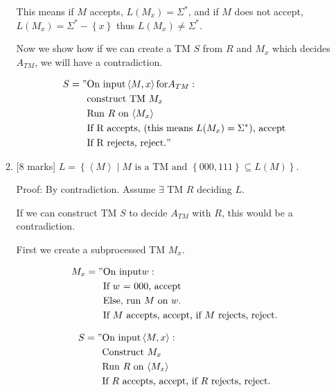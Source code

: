 \documentclass{article}
\newcommand{\set}[1]{{\left\{#1\right\}}}    %
\newcommand{\enc}[1]{\left<#1\right>}
\begin{document}
\begin{enumerate}
\begin{enumerate}
                    This means if $M$ accepts, $L(M_x) = \Sigma^*$, and if $M$ does not accept, $L(M_x) = \Sigma^* - \set{x}$ thus $L(M_x) \neq \Sigma^*$.

                    Now we show how if we can create a TM $S$ from $R$ and $M_x$ which decides $A_{TM}$, we will have a contradiction.

                    \begin{equation}
                        \begin{split}
                           S = "& \text{On input} \enc{M,x} \text{for} A_{TM}: \\
                                & \text{construct TM } M_x \\
                                & \text{Run $R$ on $\enc{M_x}$} \\
                                & \text{If R accepts, (this means $L(M_x) = \Sigma^*$), accept} \\
                                & \text{If R rejects, reject.}"
                        \end{split}
                    \end{equation}

            \item {[8 marks]} $L=\set{\enc{M}\mid M\text{ is a TM and }\set{000,111}\subseteq L(M)}$.


            		Proof: By contradiction. Assume $\exists$ TM $R$ deciding $L$.

                    If we can construct TM $S$ to decide $A_{TM}$ with $R$, this would be a contradiction.

                    First we create a subprocessed TM $M_x$.

                    \begin{equation}
                        \begin{split}
                           M_x = "& \text{On input} w: \\
                                & \text{If $w$ = $000$, accept} \\
                                & \text{Else, run $M$ on $w$.} \\
                                & \text{If $M$ accepts, accept, if $M$ rejects, reject.}
                        \end{split}
                    \end{equation}

                    \begin{equation}
                        \begin{split}
                           S = "& \text{On input} \enc{M,x}: \\
                                & \text{Construct $M_x$} \\
                                & \text{Run $R$ on $\enc{M_x}$} \\
                                & \text{If $R$ accepts, accept, if $R$ rejects, reject.}
                        \end{split}
                    \end{equation}



\end{enumerate}
\end{enumerate}
\end{document}
